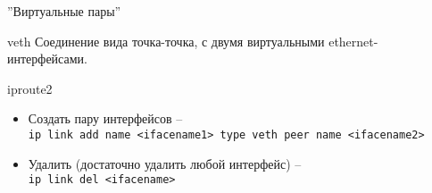 \begin{frame}{''Виртуальные пары''}
	\begin{block}{veth}
        Соединение вида точка-точка, с двумя виртуальными ethernet-интерфейсами.
	\end{block}

	\begin{block}{iproute2}
		\begin{itemize}
			\item Создать пару интерфейсов -- \\
                {\tt ip link add name <ifacename1> type veth peer name <ifacename2>}
			\item Удалить (достаточно удалить любой интерфейс) -- \\
                {\tt ip link del <ifacename> }
		\end{itemize}
	\end{block}

\end{frame}

